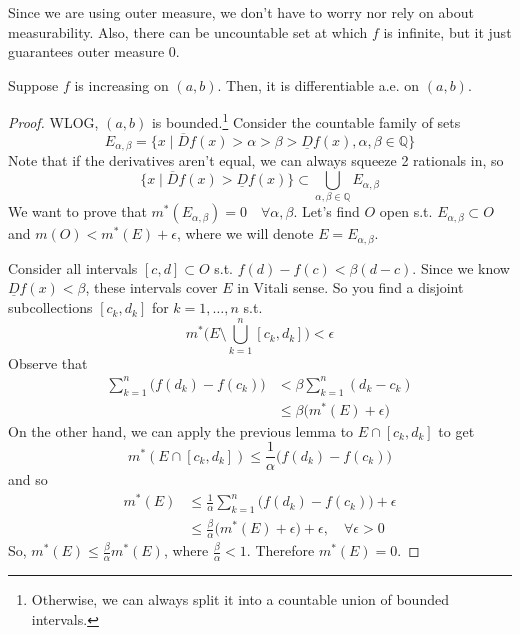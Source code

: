   Since we are using outer measure, we don't have to worry nor rely on about measurability. Also, there can be uncountable set at which $f$ is infinite, but it just guarantees outer measure $0$.  
  
  \begin{theorem}[Lebesgue]
    Suppose $f$ is increasing on $(a, b)$. Then, it is differentiable a.e. on $(a, b)$. 
  \end{theorem}
  \begin{proof}
    WLOG, $(a, b)$ is bounded.\footnote{Otherwise, we can always split it into a countable union of bounded intervals. } Consider the countable family of sets 
    \begin{equation}
      E_{\alpha, \beta} = \{x \mid \overline{D} f (x) > \alpha > \beta > \underline{D}f(x), \alpha, \beta \in \mathbb{Q} \}
    \end{equation}
    Note that if the derivatives aren't equal, we can always squeeze 2 rationals in, so 
    \begin{equation}
      \{x \mid \overline{D} f(x) > \underline{D} f(x) \} \subset \bigcup_{\alpha, \beta \in \mathbb{Q}} E_{\alpha, \beta}
    \end{equation}
    We want to prove that $m^\ast (E_{\alpha, \beta}) = 0 \quad \forall \alpha, \beta$. Let's find $O$ open s.t. $E_{\alpha, \beta} \subset O$ and $m(O) < m^\ast (E) + \epsilon$, where we will denote $E = E_{\alpha, \beta}$. 

    Consider all intervals $[c, d] \subset O$ s.t. $f(d) - f(c) < \beta (d - c)$. Since we know $\underline{D} f(x) < \beta$, these intervals cover $E$ in Vitali sense. So you find a disjoint subcollections $[c_k, d_k]$ for $k = 1, \ldots, n$ s.t. 
    \begin{equation}
      m^\ast \bigg( E \setminus \bigcup_{k=1}^n [c_k, d_k] \bigg) < \epsilon 
    \end{equation}
    Observe that 
    \begin{align}
      \sum_{k=1}^n \big( f(d_k) - f(c_k) \big) & < \beta \sum_{k=1}^n (d_k - c_k) \\ 
                                               & \leq \beta \big( m^\ast (E) + \epsilon \big)
    \end{align}
    On the other hand, we can apply the previous lemma to $E \cap [c_k, d_k]$ to get 
    \begin{equation}
      m^\ast (E \cap [c_k, d_k]) \leq \frac{1}{\alpha} \big( f(d_k) - f(c_k) \big) 
    \end{equation}
    and so 
    \begin{align}
      m^\ast (E) & \leq \frac{1}{\alpha} \sum_{k=1}^n \big( f(d_k) - f(c_k) \big) + \epsilon \\ 
                 & \leq \frac{\beta}{\alpha} \big( m^\ast(E) + \epsilon) + \epsilon, \quad \forall \epsilon > 0 
    \end{align}
    So, $m^\ast(E) \leq \frac{\beta}{\alpha} m^\ast (E)$, where $\frac{\beta}{\alpha} < 1$. Therefore $m^\ast (E) = 0$. 
  \end{proof}

